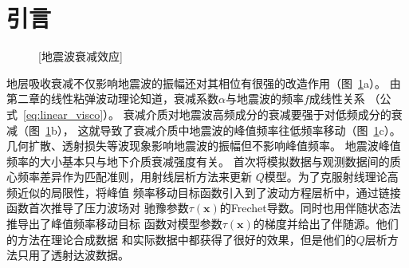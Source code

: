 \section{引言}
\begin{figure}[!htbp]
    \centering
    [地震波衰减效应]
    \label{fig:q_effect}
\end{figure}
地层吸收衰减不仅影响地震波的振幅还对其相位有很强的改造作用（图~\ref{fig:q_effect}a）。
由第二章的线性粘弹波动理论知道，衰减系数$\alpha$与地震波的频率$f$成线性关系
（公式~\ref{eq:linear_visco}）。
衰减介质对地震波高频成分的衰减要强于对低频成分的衰减（图~\ref{fig:q_effect}b），
这就导致了衰减介质中地震波的峰值频率往低频率移动（图~\ref{fig:q_effect}c）。
几何扩散、透射损失等波现象影响地震波的振幅但不影响峰值频率。
地震波峰值频率的大小基本只与地下介质衰减强度有关。
首次将模拟数据与观测数据间的质心频率差异作为匹配准则，用射线层析方法来更新
$Q$模型。为了克服射线理论高频近似的局限性，将峰值
频率移动目标函数引入到了波动方程层析中，通过链接函数首次推导了压力波场对
驰豫参数$\tau(\mathbf{x})$的Frechet导数。同时也用伴随状态法推导出了峰值频率移动目标
函数对模型参数$\tau(\mathbf{x})$的梯度并给出了伴随源。他们的方法在理论合成数据
和实际数据中都获得了很好的效果，但是他们的$Q$层析方法只用了透射达波数据。


